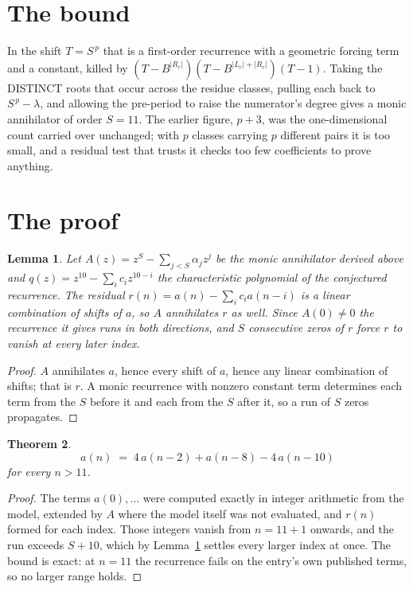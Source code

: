 \documentclass[11pt,a4paper]{article}
\theoremstyle{plain}
\newtheorem{theorem}{Theorem}
\newtheorem{lemma}[theorem]{Lemma}
\theoremstyle{definition}
\begin{document}
\section{The bound}

In the shift $T=S^{\,p}$ that is a first-order recurrence with a geometric forcing term and a
constant, killed by $(T-B^{|R_r|})(T-B^{|L_r|+|R_r|})(T-1)$. Taking the DISTINCT roots that
occur across the residue classes, pulling each back to $S^{\,p}-\lambda$, and allowing the
pre-period to raise the numerator's degree gives a monic annihilator of order $S=11$. The
earlier figure, $p+3$, was the one-dimensional count carried over unchanged; with $p$ classes
carrying $p$ different pairs it is too small, and a residual test that trusts it checks too few
coefficients to prove anything.

\section{The proof}

\begin{lemma}\label{lem:crit}
Let $A(z)=z^S-\sum_{j<S}\alpha_jz^{j}$ be the monic annihilator derived above and
$q(z)=z^{10}-\sum_ic_iz^{10-i}$ the characteristic polynomial of the conjectured
recurrence. The residual $r(n)=a(n)-\sum_ic_ia(n-i)$ is a linear combination of shifts of $a$,
so $A$ annihilates $r$ as well. Since $A(0)\ne0$ the recurrence it gives runs in both
directions, and $S$ consecutive zeros of $r$ force $r$ to vanish at every later index.
\end{lemma}

\begin{proof}
$A$ annihilates $a$, hence every shift of $a$, hence any linear combination of shifts; that is
$r$. A monic recurrence with nonzero constant term determines each term from the $S$ before it
and each from the $S$ after it, so a run of $S$ zeros propagates.
\end{proof}

\begin{theorem}
\[
a(n)\;=\;4\,a(n-2) + a(n-8) - 4\,a(n-10)
\]
for every $n>11$.
\end{theorem}

\begin{proof}
The terms $a(0),\dots$ were computed exactly in integer arithmetic from the model, extended by
$A$ where the model itself was not evaluated, and $r(n)$ formed for each index. Those integers
vanish from $n=11+1$ onwards, and the run exceeds $S+10$, which by
Lemma~\ref{lem:crit} settles every larger index at once. The bound is exact: at $n=11$ the recurrence fails on the entry's own published terms, so no larger range holds.
\end{proof}
\end{document}

